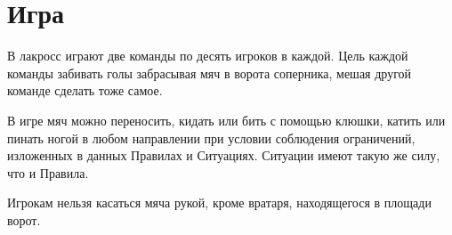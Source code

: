 \documentclass[../main.tex]{subfiles}
\begin{document}
\section*{Игра}

В лакросс играют две команды по десять игроков в каждой. Цель каждой команды забивать голы забрасывая мяч в ворота соперника, мешая другой команде сделать тоже самое.

В игре мяч можно переносить, кидать или бить с помощью клюшки, катить или пинать ногой в любом направлении при условии соблюдения ограничений, изложенных в данных Правилах и Ситуациях. Ситуации имеют такую же силу, что и Правила.

Игрокам нельзя касаться мяча рукой, кроме вратаря, находящегося в площади ворот.
\end{document}
